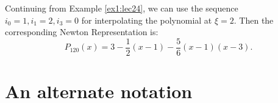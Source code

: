 \begin{example}
    Continuing from Example \ref{ex1:lec24}, we can use the sequence $ i_0=1, i_1=2, i_3 = 0$ for interpolating the polynomial at $\xi = 2$. Then the corresponding Newton Representation is:
    \[
        P_{120}(x) = 3 - \frac{1}{2}(x-1) - \frac{5}{6} (x-1)(x-3)
    .\] 

\end{example}

\section{An alternate notation}

